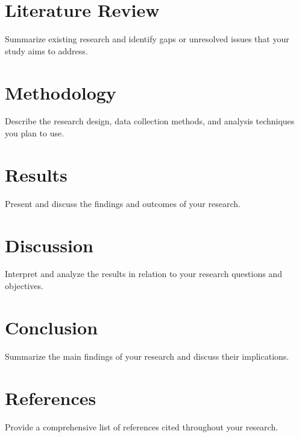 \documentclass{article}
\begin{document}
\section{Literature Review}
Summarize existing research and identify gaps or unresolved issues that your study aims to address.

\section{Methodology}
Describe the research design, data collection methods, and analysis techniques you plan to use.

\section{Results}
Present and discuss the findings and outcomes of your research.

\section{Discussion}
Interpret and analyze the results in relation to your research questions and objectives.

\section{Conclusion}
Summarize the main findings of your research and discuss their implications.

\section{References}
Provide a comprehensive list of references cited throughout your research.
\end{document}
